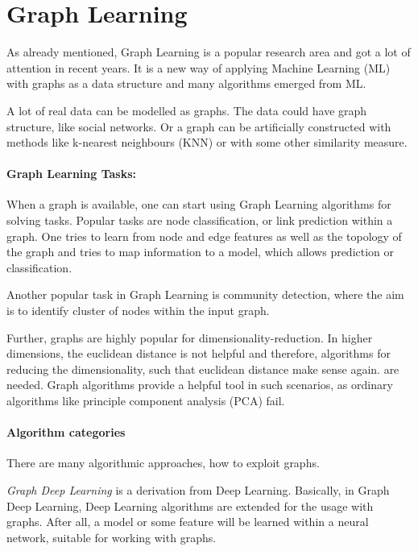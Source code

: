 \section{Graph Learning}
As already mentioned, Graph Learning is a popular research area and got a lot of attention in recent years.
It is a new way of applying Machine Learning (ML) with graphs as a data structure 
and many algorithms emerged from ML.

A lot of real data can be modelled as graphs. The data could have graph structure, like social networks. 
Or a graph can be artificially constructed with methods like k-nearest neighbours (KNN) or with some other similarity
measure.

\paragraph{Graph Learning Tasks:}
When a graph is available, one can start using Graph Learning algorithms for solving tasks.
Popular tasks are node classification, or link prediction within a graph. One tries to learn from node and edge features 
as well as the topology of the graph and tries to map information to a model, which allows prediction or classification.

Another popular task in Graph Learning is community detection, where the aim is to identify cluster of nodes within the input graph.

Further, graphs are highly popular for dimensionality-reduction. In higher dimensions, the euclidean distance is not helpful and therefore,
algorithms for reducing the dimensionality, such that euclidean distance make sense again. are needed. 
Graph algorithms provide a helpful tool in such scenarios, as ordinary algorithms like principle component analysis (PCA) fail.

\paragraph{Algorithm categories}

There are many algorithmic approaches, how to exploit graphs. 

\textit{Graph Deep Learning} is a derivation from Deep Learning. 
Basically, in Graph Deep Learning, Deep Learning algorithms are extended for the usage with graphs.
After all, a model or some feature will be learned within a neural network, suitable for working with graphs.

